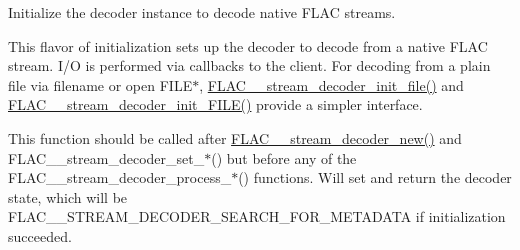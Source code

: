 Initialize the decoder instance to decode native F\+L\+AC streams.

This flavor of initialization sets up the decoder to decode from a native F\+L\+AC stream. I/O is performed via callbacks to the client. For decoding from a plain file via filename or open F\+I\+L\+E$\ast$, \mbox{\hyperlink{group__flac__stream__decoder_ga1692108a97012d1c5f79baf7df012c33}{F\+L\+A\+C\+\_\+\+\_\+stream\+\_\+decoder\+\_\+init\+\_\+file()}} and \mbox{\hyperlink{group__flac__stream__decoder_ga38f9eb46bf112af205f86b4cbac9980c}{F\+L\+A\+C\+\_\+\+\_\+stream\+\_\+decoder\+\_\+init\+\_\+\+F\+I\+L\+E()}} provide a simpler interface.

This function should be called after \mbox{\hyperlink{group__flac__stream__decoder_ga7159eefc074dfbab4a37462f69326091}{F\+L\+A\+C\+\_\+\+\_\+stream\+\_\+decoder\+\_\+new()}} and F\+L\+A\+C\+\_\+\+\_\+stream\+\_\+decoder\+\_\+set\+\_\+$\ast$() but before any of the F\+L\+A\+C\+\_\+\+\_\+stream\+\_\+decoder\+\_\+process\+\_\+$\ast$() functions. Will set and return the decoder state, which will be F\+L\+A\+C\+\_\+\+\_\+\+S\+T\+R\+E\+A\+M\+\_\+\+D\+E\+C\+O\+D\+E\+R\+\_\+\+S\+E\+A\+R\+C\+H\+\_\+\+F\+O\+R\+\_\+\+M\+E\+T\+A\+D\+A\+TA if initialization succeeded.


